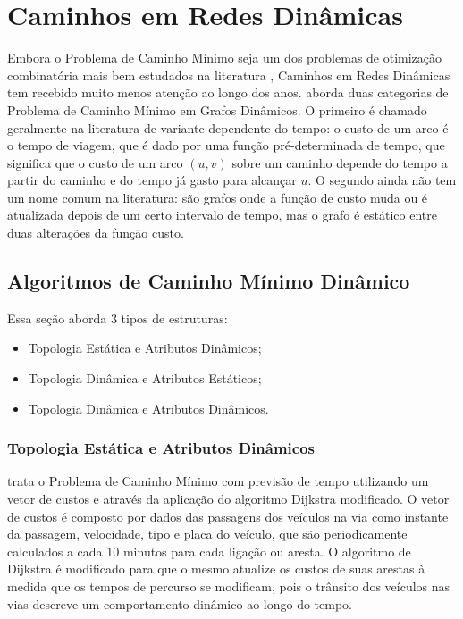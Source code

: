 \section{Caminhos em Redes Dinâmicas}
\label{sec:pathdyn}
Embora o Problema de Caminho Mínimo seja um dos problemas de otimização combinatória mais bem estudados
na literatura \cite{bookahuja}, Caminhos em Redes Dinâmicas tem recebido muito menos atenção ao longo dos anos.
\cite{giacomo} aborda duas categorias de Problema de Caminho Mínimo em Grafos Dinâmicos. O primeiro é chamado
geralmente na literatura de variante dependente do tempo: o custo de um arco é o tempo de viagem, que é dado
por uma função pré-determinada de tempo, que significa que o custo de um arco $(u, v)$ sobre um caminho
depende do tempo a partir do caminho e do tempo já gasto para alcançar $u$.
O segundo ainda não tem um nome comum na literatura: são grafos onde a função de custo muda ou é atualizada
depois de um certo intervalo de tempo, mas o grafo é estático entre duas alterações da função custo.

\subsection{Algoritmos de Caminho Mínimo Dinâmico}
Essa seção aborda 3 tipos de estruturas:
\begin{itemize}
\item Topologia Estática e Atributos Dinâmicos;
\item Topologia Dinâmica e Atributos Estáticos;
\item Topologia Dinâmica e Atributos Dinâmicos.
\end{itemize}

\subsubsection{Topologia Estática e Atributos Dinâmicos}
\label{subsec:limitesuperior}
\cite{leonard} trata o Problema de Caminho Mínimo com previsão de tempo utilizando um vetor de custos e
através da aplicação do algoritmo Dijkstra modificado. O vetor de custos é composto por dados das passagens 
dos veículos na via como instante da passagem, velocidade, tipo e placa do veículo, que são periodicamente calculados
a cada 10 minutos para cada ligação ou aresta. O algoritmo de Dijkstra é modificado para que o mesmo atualize os custos
de suas arestas à medida que os tempos de percurso se modificam, pois o trânsito dos veículos nas vias descreve um
comportamento dinâmico ao longo do tempo.

